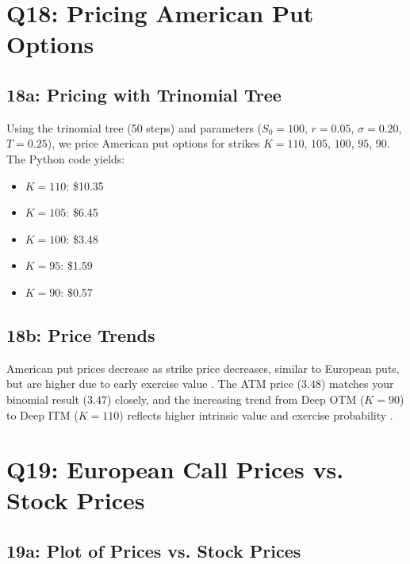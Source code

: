 \documentclass{article}
\begin{document}
\section*{Q18: Pricing American Put Options}

\subsection*{18a: Pricing with Trinomial Tree}

Using the trinomial tree (50 steps) and parameters ($S_0 = 100$, $r = 0.05$, $\sigma = 0.20$, $T = 0.25$), we price American put options for strikes $K=110$, $105$, $100$, $95$, $90$. The Python code yields:

\begin{itemize}
    \item $K=110$: \$10.35
    \item $K=105$: \$6.45
    \item $K=100$: \$3.48
    \item $K=95$: \$1.59
    \item $K=90$: \$0.57
\end{itemize}

\subsection*{18b: Price Trends}

American put prices decrease as strike price decreases, similar to European puts, but are higher due to early exercise value \citep{hull2018options}. The ATM price ($3.48$) matches your binomial result ($3.47$) closely, and the increasing trend from Deep OTM ($K=90$) to Deep ITM ($K=110$) reflects higher intrinsic value and exercise probability \citep{shreve2004stochastic}.



\section*{Q19: European Call Prices vs. Stock Prices}

\subsection*{19a: Plot of Prices vs. Stock Prices}
\end{document}
